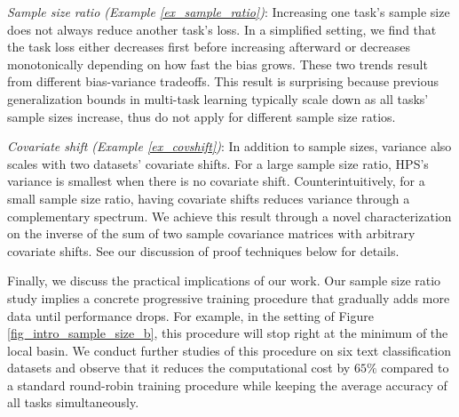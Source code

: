  \textit{Sample size ratio (Example \ref{ex_sample_ratio})}: Increasing one task's sample size does not always reduce another task's loss. In a simplified setting, we find that the task loss either decreases first before increasing afterward or decreases monotonically depending on how fast the bias grows. These two trends result from different bias-variance tradeoffs. This result is surprising because previous generalization bounds in multi-task learning typically scale down as all tasks' sample sizes increase, thus do not apply for different sample size ratios.

 \textit{Covariate shift (Example \ref{ex_covshift})}: In addition to sample sizes, variance also scales with two datasets' covariate shifts. For a large sample size ratio, HPS's  variance is smallest when there is no covariate shift. Counterintuitively, for a small sample size ratio, having covariate shifts reduces variance through a complementary spectrum. We achieve this result through a novel characterization on the inverse of the sum of two sample covariance matrices with arbitrary covariate shifts. See our discussion of proof techniques below for details.


Finally, we discuss the practical implications of our work.
Our sample size ratio study implies a concrete progressive training procedure that gradually adds more data until performance drops.
For example, in the setting of Figure \ref{fig_intro_sample_size_b}, this procedure will stop right at the minimum of the local basin.
We conduct further studies of this procedure on six text classification datasets and observe that it reduces the computational cost by $65\%$ compared to a standard round-robin training procedure while keeping the average accuracy of all tasks simultaneously.




